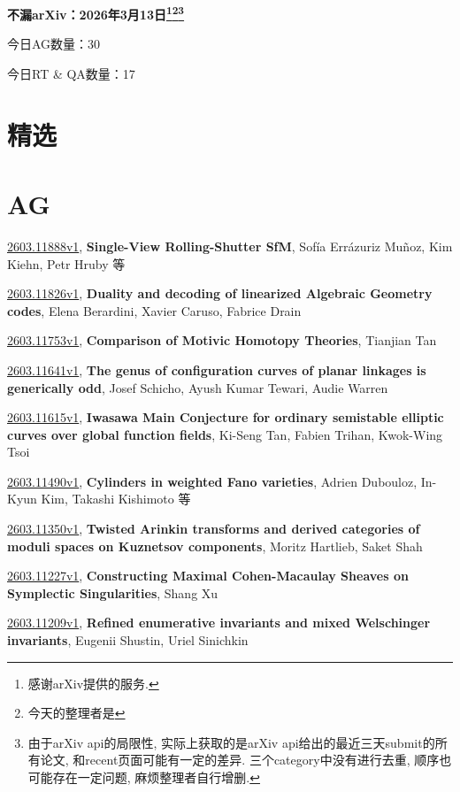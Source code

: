 \documentclass[9pt, a4paper]{article}
\theoremstyle{plain}
\theoremstyle{definition}
\theoremstyle{remark}
\newcommand{\arxiv}[3]{\href{https://arxiv.org/abs/#1}{#1}, \textbf{\textcolor{arxivblue}{#2}}, #3}
\newcommand{\AGnumber}{30}
\newcommand{\RTQAnumber}{17}
\newcommand{\NewestDate}{2026年3月13日}
\newcommand{\todayarXiver}{} %
\begin{document}
\begin{center}
    \Huge\textbf{不漏arXiv：\NewestDate\footnote{感谢arXiv提供的服务.}\footnote{今天的整理者是\todayarXiver}\footnote{由于arXiv api的局限性, 实际上获取的是arXiv api给出的最近三天submit的所有论文, 和recent页面可能有一定的差异. 三个category中没有进行去重, 顺序也可能存在一定问题, 麻烦整理者自行增删.}} \\
\end{center}

\setcounter{section}{-1}

\begin{center}
    今日AG数量：\AGnumber
    
    今日RT \& QA数量：\RTQAnumber
    
\end{center}


\section{精选}


\section{AG}
\arxiv{2603.11888v1}{Single-View Rolling-Shutter SfM}{Sofía Errázuriz Muñoz, Kim Kiehn, Petr Hruby 等}

\arxiv{2603.11826v1}{Duality and decoding of linearized Algebraic Geometry codes}{Elena Berardini, Xavier Caruso, Fabrice Drain}

\arxiv{2603.11753v1}{Comparison of Motivic Homotopy Theories}{Tianjian Tan}

\arxiv{2603.11641v1}{The genus of configuration curves of planar linkages is generically odd}{Josef Schicho, Ayush Kumar Tewari, Audie Warren}

\arxiv{2603.11615v1}{Iwasawa Main Conjecture for ordinary semistable elliptic curves over global function fields}{Ki-Seng Tan, Fabien Trihan, Kwok-Wing Tsoi}

\arxiv{2603.11490v1}{Cylinders in weighted Fano varieties}{Adrien Dubouloz, In-Kyun Kim, Takashi Kishimoto 等}

\arxiv{2603.11350v1}{Twisted Arinkin transforms and derived categories of moduli spaces on Kuznetsov components}{Moritz Hartlieb, Saket Shah}

\arxiv{2603.11227v1}{Constructing Maximal Cohen-Macaulay Sheaves on Symplectic Singularities}{Shang Xu}

\arxiv{2603.11209v1}{Refined enumerative invariants and mixed Welschinger invariants}{Eugenii Shustin, Uriel Sinichkin}
\end{document}
